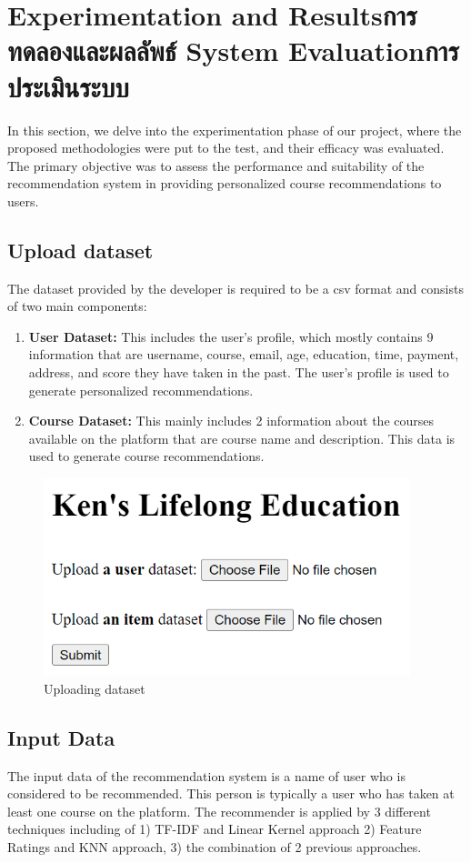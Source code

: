 \chapter{\ifproject%
\ifenglish Experimentation and Results\else การทดลองและผลลัพธ์\fi
\else%
\ifenglish System Evaluation\else การประเมินระบบ\fi
\fi}

In this section, we delve into the experimentation phase of our project, where 
the proposed methodologies were put to the test, and their efficacy was evaluated. 
The primary objective was to assess the performance and suitability of the 
recommendation system in providing personalized course recommendations to users.

\section{Upload dataset}
The dataset provided by the developer is required to be a csv format and consists of two main components:
\begin{enumerate}
    \item \textsf{\textbf{User Dataset:} This includes the user's profile, which mostly contains 9 information 
    that are username, course, email, age, education, time, payment, address, and score they have taken 
    in the past. The user's profile is used to generate personalized recommendations.}
    \item \textsf{\textbf{Course Dataset:} This mainly includes 2 information about the courses available on the 
    platform that are course name and description. This data is used to generate course recommendations.}
\end{enumerate}

\begin{figure}[H]
\center
\includegraphics[width=4.2in]{img/dataset.png}
\caption{Uploading dataset}
\end{figure}

\newpage
\section{Input Data}
The input data of the recommendation system is a name of user who is considered to be recommended.
This person is typically a user who has taken at least one course on the platform.
The recommender is applied by 3 different techniques including of 1) TF-IDF and Linear Kernel 
approach 2) Feature Ratings and KNN approach, 3) the combination of 2 previous approaches.

